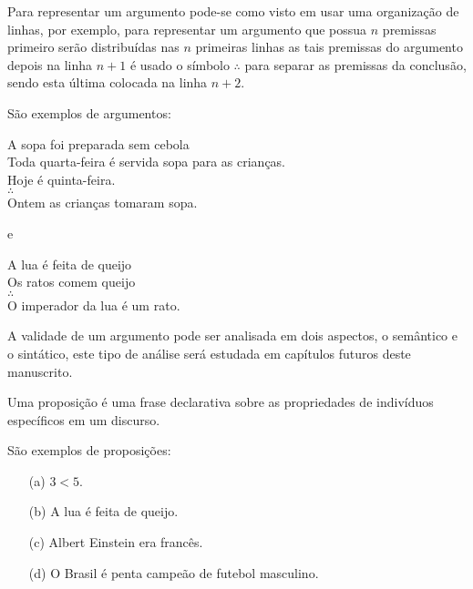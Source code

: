 Para representar um argumento pode-se como visto em \cite{copi1981, joaoPavao2014} usar uma organização de linhas, por exemplo, para representar um argumento que possua $n$ premissas primeiro serão distribuídas nas $n$ primeiras linhas as tais premissas do argumento depois na linha $n+1$ é usado o símbolo $\therefore$ para separar as premissas da conclusão, sendo esta última colocada na linha $n+2$.

\begin{example}\label{exe:Argumento}
    São exemplos de argumentos:
    
		\begin{center}
			A sopa foi preparada  sem cebola\\ 
			Toda quarta-feira é servida sopa para as crianças.\\
			Hoje é quinta-feira.\\
			$\therefore$\\
			Ontem as crianças tomaram sopa.
		\end{center}
	
		e
		
		\begin{center}
			A lua é feita de queijo\\
			Os ratos comem queijo\\ 
			$\therefore$\\
			O imperador da lua é um rato.
		\end{center}
\end{example}

A validade de um argumento pode ser analisada em dois aspectos, o semântico e o sintático, este tipo de análise será estudada em capítulos futuros deste manuscrito.

\begin{definition}[Proposição]\label{def:Proposicao}
	Uma proposição é uma frase declarativa sobre as propriedades de indivíduos específicos em um discurso.
\end{definition}

\begin{example}\label{exe:Proposicoes}
    São exemplos de proposições:
	\begin{itemize}
		\item[(a)] $3 < 5$.
		\item[(b)] A lua é feita de queijo.
		\item[(c)] Albert Einstein era francês.
		\item[(d)] O Brasil é penta campeão de futebol masculino.
	\end{itemize}
\end{example}

